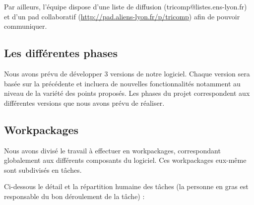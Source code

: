 \documentclass{article}
\begin{document}
Par ailleurs, l'équipe dispose d'une liste de diffusion (tricomp@listes.ens-lyon.fr) et d'un pad collaboratif (\url{http://pad.aliens-lyon.fr/p/tricomp}) afin de pouvoir communiquer.

\subsection{Les différentes phases}

Nous avons prévu de développer 3 versions de notre logiciel. Chaque version sera basée sur la précédente et incluera de nouvelles fonctionnalités notamment au niveau de la variété des points proposés.
Les phases du projet correspondent aux différentes versions que nous avons prévu de réaliser.


\subsection{Workpackages}

Nous avons divisé le travail à effectuer en workpackages, correspondant globalement aux différents composants du logiciel. Ces workpackages eux-même sont subdivisés en tâches.

Ci-dessous le détail et la répartition humaine des tâches (la personne en gras est responsable du bon déroulement de la tâche) :
\end{document}
